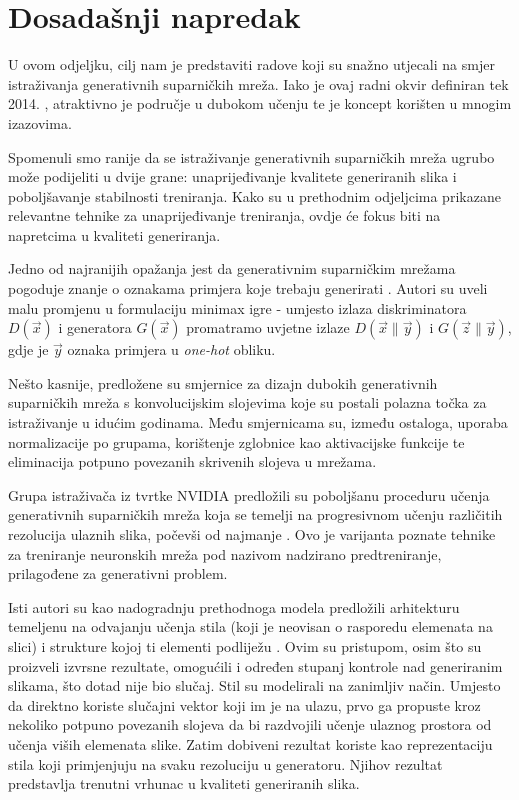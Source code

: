 \section{Dosadašnji napredak}
\label{prijasnji_rad}
U ovom odjeljku, cilj nam je predstaviti radove koji su snažno utjecali na smjer istraživanja generativnih suparničkih mreža. Iako je ovaj radni okvir definiran tek 2014. \citep{orig_paper}, atraktivno je područje u dubokom učenju te je koncept korišten u mnogim izazovima.

Spomenuli smo ranije da se istraživanje generativnih suparničkih mreža ugrubo može podijeliti u dvije grane: unaprijeđivanje kvalitete generiranih slika i poboljšavanje stabilnosti treniranja. Kako su u prethodnim odjeljcima prikazane relevantne tehnike za unaprijeđivanje treniranja, ovdje će fokus biti na napretcima u kvaliteti generiranja.

Jedno od najranijih opažanja jest da generativnim suparničkim mrežama pogoduje znanje o oznakama primjera koje trebaju generirati \citep{mirza2014conditional}. Autori su uveli malu promjenu u formulaciju minimax igre - umjesto izlaza diskriminatora $D(\vec{x})$ i generatora $G(\vec{x})$ promatramo uvjetne izlaze $D(\vec{x}\|\vec{y})$ i $G(\vec{z}\|\vec{y})$, gdje je $\vec{y}$ oznaka primjera u \textit{one-hot} obliku.

Nešto kasnije, predložene su smjernice za dizajn dubokih generativnih suparničkih mreža s konvolucijskim slojevima \citep{radford2015unsupervised} koje su postali polazna točka za istraživanje u idućim godinama. Među smjernicama su, između ostaloga, uporaba normalizacije po grupama, korištenje zglobnice kao aktivacijske funkcije te eliminacija potpuno povezanih skrivenih slojeva u mrežama.

Grupa istraživača iz tvrtke NVIDIA predložili su poboljšanu proceduru učenja generativnih suparničkih mreža koja se temelji na progresivnom učenju različitih rezolucija ulaznih slika, počevši od najmanje \citep{karras2017progressive}. Ovo je varijanta poznate tehnike za treniranje neuronskih mreža pod nazivom nadzirano predtreniranje, prilagođene za generativni problem.

Isti autori su kao nadogradnju prethodnoga modela predložili arhitekturu temeljenu na odvajanju učenja stila (koji je neovisan o rasporedu elemenata na slici) i strukture kojoj ti elementi podliježu \citep{karras2019style}. Ovim su pristupom, osim što su proizveli izvrsne rezultate, omogućili i određen stupanj kontrole nad generiranim slikama, što dotad nije bio slučaj. Stil su modelirali na zanimljiv način. Umjesto da direktno koriste slučajni vektor koji im je na ulazu, prvo ga propuste kroz nekoliko potpuno povezanih slojeva da bi razdvojili učenje ulaznog prostora od učenja viših elemenata slike. Zatim dobiveni rezultat koriste kao reprezentaciju stila koji primjenjuju na svaku rezoluciju u generatoru. Njihov rezultat predstavlja trenutni vrhunac u kvaliteti generiranih slika.

